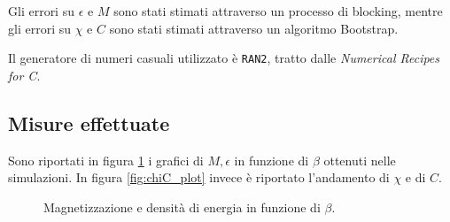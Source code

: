 \documentclass[a4paper,11pt]{article}
\newcommand{\code}[1]{\texttt{#1}}
\begin{document}
	Gli errori su $\epsilon$ e $M$ sono stati
	stimati attraverso un processo di blocking, mentre gli errori su $\chi$ e $C$ sono stati stimati attraverso un algoritmo Bootstrap.

	Il generatore di numeri casuali utilizzato è \code{RAN2}, tratto dalle \emph{Numerical Recipes for C}.
	
	\subsection{Misure effettuate}
	
	Sono riportati in figura \ref{fig:em_plot} i grafici di $M, \epsilon$ in funzione di $\beta$ ottenuti nelle simulazioni. In figura \ref{fig:chiC_plot} invece è riportato l'andamento di $\chi$ e di $C$.
	
	\begin{figure}[htb]
        \caption{Magnetizzazione e densità di energia in funzione di $\beta$.}
        \label{fig:em_plot}
	\end{figure}
	
\end{document}
